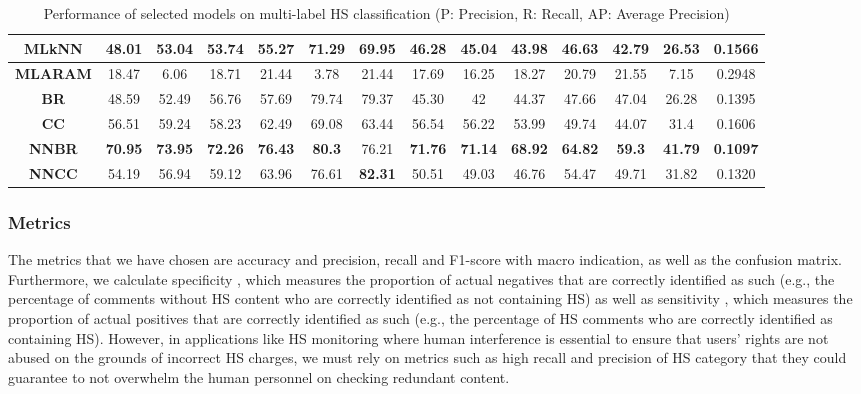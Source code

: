 \documentclass[sigconf]{acmart}
\begin{document}
\begin{table*}[t]
{\begin{tabular}{|c|c|c|c|c|c|c|c|c|c|c|c|c|c|}
\textbf{MLkNN} & 48.01 & 53.04 & 53.74 & 55.27 & 71.29 & 69.95 & 46.28 & 45.04 & 43.98 & 46.63 & 42.79 & 26.53 & 0.1566 \\ \hline
\textbf{MLARAM} & 18.47 & 6.06 & 18.71 & 21.44 & 3.78 & 21.44 & 17.69 & 16.25 & 18.27 & 20.79 & 21.55 & 7.15 & 0.2948 \\ \hline
\textbf{BR} & 48.59 & 52.49 & 56.76 & 57.69 & 79.74 & 79.37 & 45.30 & 42 & 44.37 & 47.66 & 47.04 & 26.28 & 0.1395 \\ \hline
\textbf{CC} & 56.51 & 59.24 & 58.23 & 62.49 & 69.08 & 63.44 & 56.54 & 56.22 & 53.99 & 49.74 & 44.07 & 31.4 & 0.1606 \\ \hline
\textbf{NNBR} & \textbf{70.95} & \textbf{73.95} & \textbf{72.26} & \textbf{76.43} & \textbf{80.3} & 76.21 & \textbf{71.76} & \textbf{71.14} & \textbf{68.92} & \textbf{64.82} & \textbf{59.3} & \textbf{41.79} & \textbf{0.1097} \\ \hline
\textbf{NNCC} & 54.19 & 56.94 & 59.12 & 63.96 & 76.61 & \textbf{82.31} & 50.51 & 49.03 & 46.76 & 54.47 & 49.71 & 31.82 & 0.1320 \\ \hline
\end{tabular}}
\caption{Performance of selected models on multi-label HS classification (P: Precision, R: Recall, AP: Average Precision)}
\label{tab:mllresults}
\end{table*}

\subsubsection{Metrics}
The metrics that we have chosen are accuracy and precision, recall and F1-score with macro indication, as well as the confusion matrix. Furthermore, we calculate specificity , which measures the proportion of actual negatives that are correctly identified as such (e.g., the percentage of comments without HS content who are correctly identified as not containing HS) as well as sensitivity , which measures the proportion of actual positives that are correctly identified as such (e.g., the percentage of HS comments who are correctly identified as containing HS). However, in applications like HS monitoring where human interference is essential to ensure that users' rights are not abused on the grounds of incorrect HS charges, we must rely on metrics such as high recall and precision of HS category that they could guarantee to not overwhelm the human personnel on checking redundant content.
\end{document}
